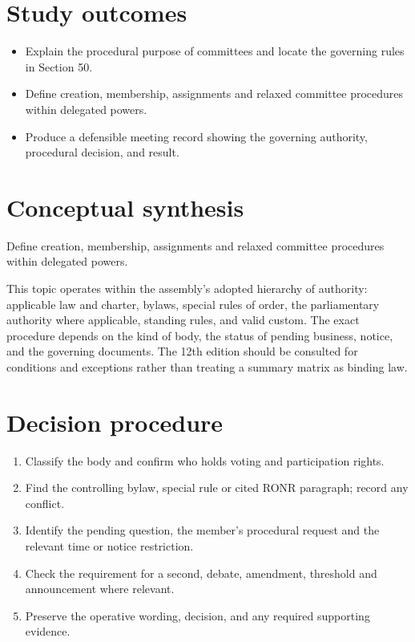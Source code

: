 \documentclass[11pt]{article}
\begin{document}
\SuiteOpen
{}
\section{Study outcomes}
\begin{itemize}[leftmargin=*,itemsep=4pt]
\item Explain the procedural purpose of committees and locate the governing rules in Section 50.
\item Define creation, membership, assignments and relaxed committee procedures within delegated powers.
\item Produce a defensible meeting record showing the governing authority, procedural decision, and result.
\end{itemize}

\section{Conceptual synthesis}
Define creation, membership, assignments and relaxed committee procedures within delegated powers.

This topic operates within the assembly’s adopted hierarchy of authority: applicable law and charter, bylaws, special rules of order, the parliamentary authority where applicable, standing rules, and valid custom. The exact procedure depends on the kind of body, the status of pending business, notice, and the governing documents. The 12th edition should be consulted for conditions and exceptions rather than treating a summary matrix as binding law.
\section{Decision procedure}
\begin{enumerate}[leftmargin=*,itemsep=4pt]
\item Classify the body and confirm who holds voting and participation rights.
\item Find the controlling bylaw, special rule or cited RONR paragraph; record any conflict.
\item Identify the pending question, the member’s procedural request and the relevant time or notice restriction.
\item Check the requirement for a second, debate, amendment, threshold and announcement where relevant.
\item Preserve the operative wording, decision, and any required supporting evidence.
\end{enumerate}
\end{document}
